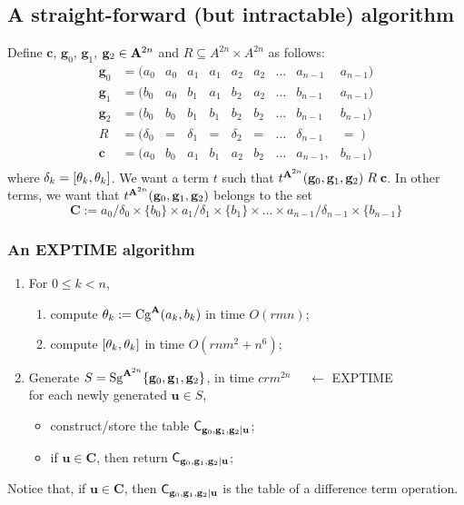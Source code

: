 \subsection{A straight-forward (but intractable) algorithm}
Define $\mathbf{c}$, $\mathbf{g}_0$, $\mathbf{g}_1$, $\mathbf{g}_2 \in \mathbf{A}^{2n}$ 
and $R \subseteq A^{2n}\times A^{2n}$ as follows:
\begin{equation}
\begin{array}{cccccccccc}
  \mathbf{g}_0 &= (a_0 & a_0 &a_1 &a_1 &a_2 &a_2 & \dots & a_{n-1} & a_{n-1}) \\
  \mathbf{g}_1 &= (b_0 & a_0 &b_1 &a_1 &b_2 &a_2 & \dots & b_{n-1} & a_{n-1}) \\
  \mathbf{g}_2 &= (b_0 & b_0 &b_1 &b_1 &b_2 &b_2 & \dots & b_{n-1} & b_{n-1})\\[4pt]
    R  & = (\delta_0 & =  & \delta_1 & = & \delta_2 & = & \dots  & \delta_{n-1} & = \; )\\ [4pt]
  \mathbf{c}            & = (a_0     & b_0       & a_1      & b_1      & a_2      & b_2      & \dots  & a_{n-1}, & b_{n-1}) \\
\end{array}
\end{equation}
where $\delta_k= [\theta_k, \theta_k]$.  We want a term $t$ such that $t^{\mathbf{A}^{2n}}(\mathbf{g}_0, \mathbf{g}_1, \mathbf{g}_2)\mathrel{R} \mathbf{c}$.
In other terms, we want that $t^{\mathbf{A}^{2n}}(\mathbf{g}_0, \mathbf{g}_1, \mathbf{g}_2)$ belongs to the set
\[
\mathbf{C} := a_0/\delta_0 \times \{b_0\} \times a_1/\delta_1 \times \{b_1\} \times   \dots \times a_{n-1}/\delta_{n-1} \times \{b_{n-1}\}
\]
\subsubsection{An {\small EXPTIME} algorithm}
 \begin{enumerate}
   \item For $0\leq k < n$,
   \begin{enumerate}
     \item compute $\theta_k:= \operatorname{Cg}^{\mathbf{A}}(a_k, b_k)$ in time $O(rmn)$;
     \item compute $[ \theta_k ,  \theta_k ]$ in time $O(rnm^2 + n^6)$;
   \end{enumerate}
\item Generate $S=\operatorname{Sg}^{\mathbf{A}^{2n}} \{\mathbf{g}_0, \mathbf{g}_1, \mathbf{g}_2\}$,
  in time $c r m^{2n}$ {\tiny {\color{red} $\quad \leftarrow$ EXPTIME}}\\
for each newly generated $\mathbf{u} \in S$, 
  \begin{itemize}
  \item construct/store the table
    $\mathsf{C}_{\mathbf{g}_0, \mathbf{g}_1, \mathbf{g}_2|\mathbf{u}}$;
  \item if $\mathbf{u} \in \mathbf{C}$, then return     $\mathsf{C}_{\mathbf{g}_0, \mathbf{g}_1, \mathbf{g}_2|\mathbf{u}}$;
  \end{itemize}
\end{enumerate}
Notice that, if $\mathbf{u} \in \mathbf{C}$, then $\mathsf{C}_{\mathbf{g}_0, \mathbf{g}_1, \mathbf{g}_2|\mathbf{u}}$  is the table of a difference term operation.

